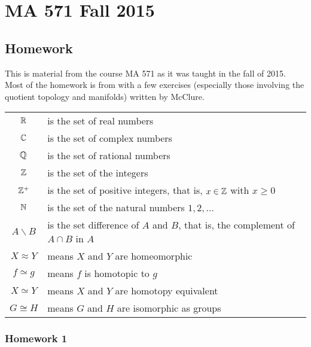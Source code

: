 \chapter{MA 571 Fall 2015}
\thispagestyle{empty}
\bigskip
\section{Homework}
This is material from the course MA 571 as it was taught in the fall of
2015. Most of the homework is from \cite{munkres} with a few exercises
(especially those involving the quotient topology and manifolds) written by
McClure.

\begin{tabular}{cl}
  $\mathbb{R}$ & is the set of real numbers\\
  $\mathbb{C}$ & is the set of complex numbers\\
  $\mathbb{Q}$ & is the set of rational numbers\\
  $\mathbb{Z}$ & is the set of the integers\\
  $\mathbb{Z}^+$ & is the set of positive integers, that is, $x\in\mathbb{Z}$ with
             $x\geq 0$\\
  $\mathbb{N}$ & is the set of the natural numbers $1,2,\dotsc$\\
  $A\smallsetminus B$ & is the set difference of $A$ and $B$, that is, the
                        complement of $A\cap B$ in $A$\\
  $X\approx Y$& means $X$ and $Y$ are homeomorphic\\
  $f\simeq g$& means $f$ is homotopic to $g$\\
  $X\simeq Y$&means $X$ and $Y$ are homotopy equivalent\\
  $G\cong H$& means $G$ and $H$ are isomorphic as groups
\end{tabular}

\newpage
\subsection{Homework 1}


